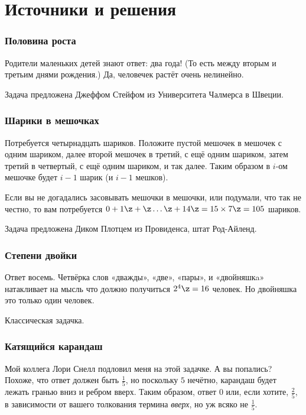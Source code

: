 \section*{Источники и решения}

\subsubsection*{Половина роста}

Родители маленьких детей знают ответ: два года!
(То есть между вторым и третьим днями рождения.)
Да, человечек растёт очень нелинейно.

Задача предложена Джеффом Стейфом из Университета Чалмерса в Швеции.

\subsubsection*{Шарики в мешочках}

Потребуется четырнадцать шариков.
Положите пустой мешочек в мешочек с одним шариком, 
далее второй мешочек в третий, с ещё одним шариком, затем третий в четвертый, с ещё одним шариком, и так далее.
Таким образом в $i$-ом мешочке будет $i-1$ шарик (и $i-1$ мешков).

Если вы не догадались засовывать мешочки в мешочки, или подумали, что так не честно, то вам потребуется $0 + 1 \z+ \z\dots \z+ 14 \z= 15 \times 7 \z= 105$ шариков.

Задача предложена Диком Плотцем из Провиденса, штат Род-Айленд.

\subsubsection*{Степени двойки}

Ответ восемь.
Четвёрка слов «дважды», «две», «пары», и «двойняшкa» натакливает на мысль что должно получиться $2^4 \z= 16$ человек.
Но двойняшка это только один человек.

Классическая задачка.

\subsubsection*{Катящийся карандаш}

Мой коллега Лори Снелл подловил меня на этой задачке.
А вы попались?
Похоже, что ответ должен быть $\tfrac15$, но поскольку $5$ нечётно, карандаш будет лежать гранью вниз и ребром вверх.
Таким образом, ответ $0$ или, если хотите, $\tfrac25$, в зависимости от вашего толкования термина \emph{вверх}, но уж всяко не $\tfrac15$.

